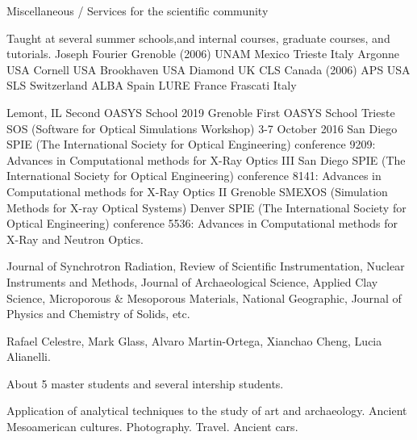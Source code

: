 \begin{rubric}{Miscellaneous / Services for the scientific community}

\entry*[] Taught at several summer schools,and internal courses, graduate courses, and tutorials.
\entry*[2006] Joseph Fourier Grenoble (2006)
\entry*[2005 -- 2002] UNAM Mexico
\entry*[2016] Trieste Italy
\entry*[2013] Argonne USA
\entry*[2011] Cornell USA
\entry*[2010] Brookhaven USA
\entry*[2009] Diamond UK
\entry*[2006] CLS Canada (2006)
\entry*[2002] APS USA
\entry*[1998] SLS Switzerland
\entry*[1996] ALBA Spain
\entry*[1992] LURE France
\entry*[1992] Frascati Italy

\entry*[2019] Lemont, IL Second OASYS School 2019
\entry*[2019] Grenoble First OASYS School
\entry*[2016] Trieste SOS (Software for Optical Simulations Workshop) 3-7 October 2016
\entry*[2014] San Diego SPIE (The International Society for Optical Engineering) conference 9209: Advances in Computational methods for X-Ray Optics III
\entry*[2011] San Diego SPIE (The International Society for Optical Engineering) conference 8141: Advances in Computational methods for X-Ray Optics II
\entry*[2009] Grenoble SMEXOS (Simulation Methods for X-ray Optical Systems)
 Denver SPIE (The International Society for Optical Engineering) conference 5536: Advances in Computational methods for X-Ray and Neutron Optics.

\entry*[] Journal of Synchrotron Radiation, Review of Scientific Instrumentation, Nuclear Instruments and Methods,  Journal of Archaeological Science, Applied Clay Science, Microporous \& Mesoporous Materials, National Geographic, Journal of Physics and Chemistry of Solids, etc.

\entry*[Ph.D.] Rafael Celestre, Mark Glass, Alvaro Martin-Ortega,  Xianchao Cheng, Lucia Alianelli.

\entry*[Others] About 5 master students and several intership students. 

\entry*[] Application of analytical techniques to the study of art and archaeology. Ancient Mesoamerican cultures. Photography. Travel. Ancient cars.



\end{rubric}